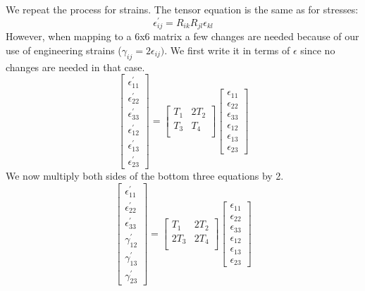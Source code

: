\documentclass{article}
\begin{document}
We repeat the process for strains.  The tensor equation is the same as for stresses:
\begin{equation}
\epsilon^\prime_{ij} = R_{ik} R_{jl} \epsilon_{kl}
\end{equation}
However, when mapping to a 6x6 matrix a few changes are needed because of our use of engineering strains ($\gamma_{ij} = 2 \epsilon_{ij})$.  We first write it in terms of $\epsilon$ since no changes are needed in that case.
\begin{equation}
\begin{bmatrix}
\epsilon_{11}^\prime \\
\epsilon_{22}^\prime \\
\epsilon_{33}^\prime \\
\epsilon_{12}^\prime \\
\epsilon_{13}^\prime \\
\epsilon_{23}^\prime
\end{bmatrix}
=
\begin{bmatrix}
T_1 & 2T_2 \\
T_3 & T_4 \\
\end{bmatrix}
\begin{bmatrix}
\epsilon_{11} \\
\epsilon_{22} \\
\epsilon_{33} \\
\epsilon_{12} \\
\epsilon_{13} \\
\epsilon_{23}
\end{bmatrix}
\end{equation}
We now multiply both sides of the bottom three equations by 2.
\begin{equation}
\begin{bmatrix}
\epsilon_{11}^\prime \\
\epsilon_{22}^\prime \\
\epsilon_{33}^\prime \\
\gamma_{12}^\prime \\
\gamma_{13}^\prime \\
\gamma_{23}^\prime
\end{bmatrix}
=
\begin{bmatrix}
T_1 & 2T_2 \\
2 T_3 & 2 T_4 \\
\end{bmatrix}
\begin{bmatrix}
\epsilon_{11} \\
\epsilon_{22} \\
\epsilon_{33} \\
\epsilon_{12} \\
\epsilon_{13} \\
\epsilon_{23}
\end{bmatrix}
\end{equation}
\end{document}
